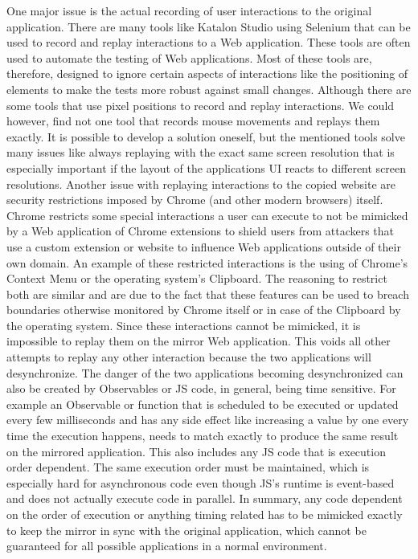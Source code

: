  One major issue is the actual recording of user interactions to the original application. There are many tools like Katalon Studio \cite{Katalon} using Selenium \cite{Selenium} that can be used to record and replay interactions to a Web application. These tools are often used to automate the testing of Web applications. Most of these tools are, therefore, designed to ignore certain aspects of interactions like the positioning of elements to make the tests more robust against small changes. Although there are some tools that use pixel positions to record and replay interactions. We could however, find not one tool that records mouse movements and replays them exactly. It is possible to develop a solution oneself, but the mentioned tools solve many issues like always replaying with the exact same screen resolution that is especially important if the layout of the applications UI reacts to different screen resolutions. Another issue with replaying interactions to the copied website are security restrictions imposed by Chrome (and other modern browsers) itself. Chrome restricts some special interactions a user can execute to not be mimicked by a Web application of Chrome extensions to shield users from attackers that use a custom extension or website to influence Web applications outside of their own domain. An example of these restricted interactions is the using of Chrome's Context Menu or the operating system's Clipboard. The reasoning to restrict both are similar and are due to the fact that these features can be used to breach boundaries otherwise monitored by Chrome itself or in case of the Clipboard by the operating system. Since these interactions cannot be mimicked, it is impossible to replay them on the mirror Web application. This voids all other attempts to replay any other interaction because the two applications will desynchronize. The danger of the two applications becoming desynchronized can also be created by Observables or JS code, in general, being time sensitive. For example an Observable or function that is scheduled to be executed or updated every few milliseconds and has any side effect like increasing a value by one every time the execution happens, needs to match exactly to produce the same result on the mirrored application. This also includes any JS code that is execution order dependent. The same execution order must be maintained, which is especially hard for asynchronous code even though JS's runtime is event-based \cite{EventBasedJS} and does not actually execute code in parallel. In summary, any code dependent on the order of execution or anything timing related has to be mimicked exactly to keep the mirror in sync with the original application, which cannot be guaranteed for all possible applications in a normal environment. \\

